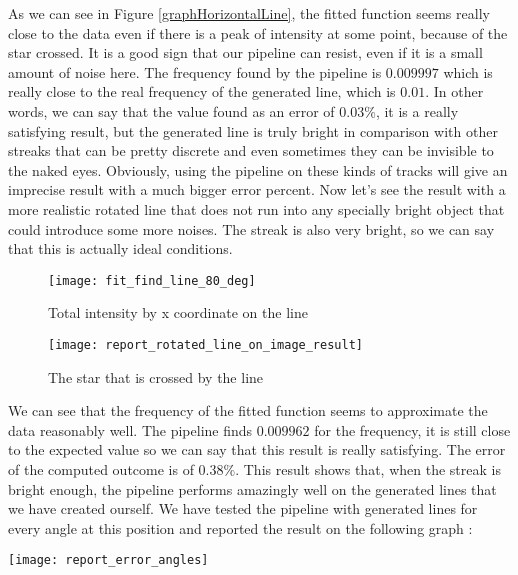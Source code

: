 \documentclass[a4paper,12pt,oneside]{report}
\begin{document}
As we can see in Figure \ref{graphHorizontalLine}, the fitted function seems really close to the data even if there is a peak of intensity
at some point, because of the star crossed. It is a good sign that our pipeline can resist, even if it is a small amount of noise here. 
\newline
The frequency found by the pipeline is $0.009997$ which is really close to the real frequency of the generated line, which is $0.01$. 
In other words, we can say that the value found as an error of $0.03\%$, it is a really satisfying result, but the generated line
is truly bright in comparison with other streaks that can be pretty discrete and even sometimes they can be invisible to the naked eyes.
Obviously, using the pipeline on these kinds of tracks will give an imprecise result with a much bigger error percent.
\newline
\newline
Now let's see the result with a more realistic rotated line that does not run into any specially bright object that could introduce some 
more noises. The streak is also very bright, so we can say that this is actually ideal conditions.
\begin{figure}[h]
    \begin{minipage}[c]{.47\linewidth}
        \centering
        \texttt{[image: fit\_find\_line\_80\_deg]}
        \caption{Total intensity by x coordinate on the line}
        \label{graphRotatedLine}
    \end{minipage}
    \hfill
    \begin{minipage}[c]{.47\linewidth}
        \centering
        \texttt{[image: report\_rotated\_line\_on\_image\_result]}
        \caption{The star that is crossed by the line}
    \end{minipage}
\end{figure}
\newline
We can see that the frequency of the fitted function seems to approximate the data reasonably well. The pipeline finds $0.009962$ for the
frequency, it is still close to the expected value so we can say that this result is really satisfying. The error of the computed outcome
is of $0.38\%$. This result shows that, when the streak is bright enough, the pipeline performs amazingly well on the generated lines that
we have created ourself. We have tested the pipeline with generated lines for every angle at this position and reported the result on the
following graph :
\begin{center}
    \texttt{[image: report\_error\_angles]}
    \label{error_angles_graph}
\end{center}
\end{document}
